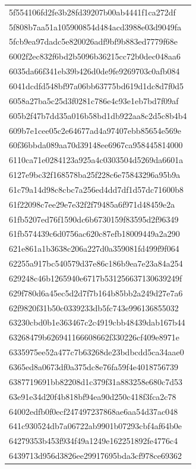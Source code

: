 \begin{tabular}{l}
5f554106fd2fe3b28fd39207b00ab4441f1ca272df \\
5f808b7aa51a105900854d484acd3988e03d9049fa \\
5fcb9ea97dadc5e820026adf9bf9b883ed7779f68e \\
6002f2ec832f6bd2b5096b36215cc72b0dec048aa6 \\
6035da66f341eb39b426d0de9fe9269703c0afb084 \\
6041dcdfd548bf97a06bb63775bd619d1dc8d7f0d5 \\
6058a27ba5c25d3f0281c786e4c93e1eb7bd7f09af \\
605b2f47b7dd35a016b58bd1db922aa8c2d5c8b4b4 \\
609b7e1cee05c2e64677ad4a97407ebb85654e569e \\
60f36bbda089aa70d39148ee6967ca958445814000 \\
6110ca71e0284123a925a4c0303504d5269da6601a \\
6127e9bc32f168578ba25f228c6e75843296a95b9a \\
61c79a14d98c8cbc7a256ed4dd7df1d57dc71600b8 \\
61f22098c7ee29e7e32f2f79485a6f971d48459e2a \\
61fb5207ed76f1590dc6b6730159f83595d2f96349 \\
61fb574439c6d0756ac620c87efb18009449a2a290 \\
621e861a1b3638c206a227d0a359081fd499f9f064 \\
62255a917bc540579d37e86c186b9ea7e23a84a254 \\
629248c46b1265940e6717b531256637130639249f \\
629f780d6a45ec5d2d7f7b164b85bb2a249d27e7a6 \\
62f9820f31b50c0339233db5fc743e996136855032 \\
63230cbd0b1e363467c2c4919cbb48439dab167b44 \\
63268479b626941166608662f330226cf409e8971e \\
6335975ee52a477c7b63268de23bdbcdd5ca34aae0 \\
6365ed8a0673df0a375dc8e76fa59f4e4018756739 \\
6387719691bb82208d1c379f31a883258e680c7d53 \\
63e91e34d20f4b818bf94ea90d250c418f3fca2c78 \\
64002edfb0f0ecf247497237868ae6aa54d37ac048 \\
641c930524db7a06722ab9901b07293cbf4af64b0e \\
64279353b453f934f49a1249e162251892fe4776c4 \\
6439713d956d3826ee29917695bda3cf978ce69362 \\

\end{tabular}
